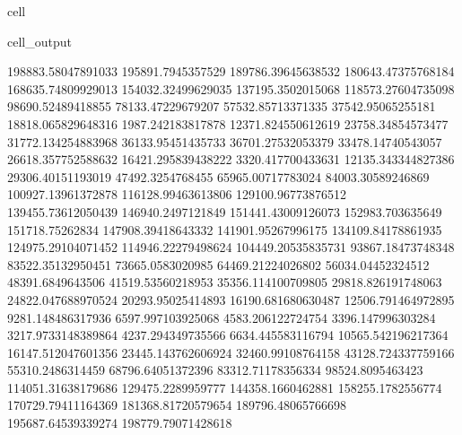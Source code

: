 \documentclass[letterpaper,10pt,english]{jupyterBook}
\begin{document}
\begin{sphinxuseclass}{cell}
\begin{sphinxVerbatimOutput}
\begin{sphinxuseclass}{cell_output}
\begin{sphinxVerbatim}[commandchars=\\\{\}]
198883.58047891033  195891.7945357529  189786.39645638532  180643.47375768184  168635.74809929013  154032.32499629035  137195.3502015068  118573.27604735098  98690.52489418855  78133.47229679207  57532.85713371335  37542.95065255181  18818.065829648316  1987.242183817878  \PYGZhy{}12371.824550612619  \PYGZhy{}23758.34854573477  \PYGZhy{}31772.134254883968  \PYGZhy{}36133.95451435733  \PYGZhy{}36701.27532053379  \PYGZhy{}33478.14740543057  \PYGZhy{}26618.357752588632  \PYGZhy{}16421.295839438222  \PYGZhy{}3320.417700433631  12135.343344827386  29306.40151193019  47492.3254768455  65965.00717783024  84003.30589246869  100927.13961372878  116128.99463613806  129100.96773876512  139455.73612050439  146940.2497121849  151441.43009126073  152983.703635649  151718.75262834  147908.39418643332  141901.95267996175  134109.84178861935  124975.29104071452  114946.22279498624  104449.20535835731  93867.18473748348  83522.35132950451  73665.0583020985  64469.21224026802  56034.04452324512  48391.6849643506  41519.53560218953  35356.114100709805  29818.826191748063  24822.047688970524  20293.95025414893  16190.681680630487  12506.791464972895  9281.148486317936  6597.997103925068  4583.206122724754  3396.147996303284  3217.9733148389864  4237.294349735566  6634.445583116794  10565.542196217364  16147.512047601356  23445.143762606924  32460.99108764158  43128.724337759166  55310.2486314459  68796.64051372396  83312.71178356334  98524.8095463423  114051.31638179686  129475.2289959777  144358.1660462881  158255.1782556774  170729.79411164369  181368.81720579654  189796.48065766698  195687.64539339274  198779.79071428618  

\end{sphinxVerbatim}
\end{sphinxuseclass}
\end{sphinxVerbatimOutput}
\end{sphinxuseclass}
\end{document}
